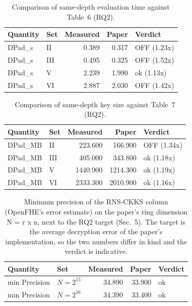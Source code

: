 \begin{table}[htbp]
  \centering
  \caption{Comparison of same-depth evaluation time against Table~6 (RQ2).}
  \label{tab:compare-table6}
  \begin{tabular}{l l r r l}
    \toprule
    Quantity & Set & Measured & Paper & Verdict \\
    \midrule
    DPad\_s & II & 0.389 & 0.317 & OFF (1.23x) \\
    DPad\_s & III & 0.495 & 0.325 & OFF (1.52x) \\
    DPad\_s & V & 2.239 & 1.990 & ok (1.13x) \\
    DPad\_s & VI & 2.887 & 2.030 & OFF (1.42x) \\
    \bottomrule
  \end{tabular}
\end{table}

\begin{table}[htbp]
  \centering
  \caption{Comparison of same-depth key size against Table~7 (RQ2).}
  \label{tab:compare-table7}
  \begin{tabular}{l l r r l}
    \toprule
    Quantity & Set & Measured & Paper & Verdict \\
    \midrule
    DPad\_MB & II & 223.600 & 166.900 & OFF (1.34x) \\
    DPad\_MB & III & 405.000 & 343.800 & ok (1.18x) \\
    DPad\_MB & V & 1440.900 & 1214.300 & ok (1.19x) \\
    DPad\_MB & VI & 2333.300 & 2010.900 & ok (1.16x) \\
    \bottomrule
  \end{tabular}
\end{table}

\begin{table}[htbp]
  \centering
  \caption{Minimum precision of the RNS-CKKS column (OpenFHE's error estimate) on the paper's ring dimension N = r x n, next to the RQ2 target (Sec.~5). The target is the average decryption error of the paper's implementation, so the two numbers differ in kind and the verdict is indicative.}
  \label{tab:compare-precision}
  \begin{tabular}{l l r r l}
    \toprule
    Quantity & Set & Measured & Paper & Verdict \\
    \midrule
    min Precision & $N = 2^{15}$ & 34.890 & 33.900 & ok \\
    min Precision & $N = 2^{16}$ & 34.390 & 33.400 & ok \\
    \bottomrule
  \end{tabular}
\end{table}

